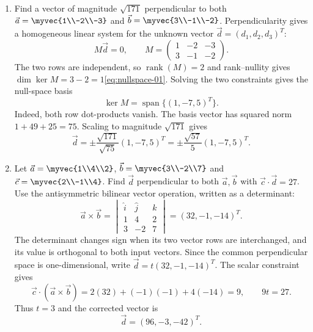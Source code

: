 
\renewcommand{\theenumi}{\thesubsection.\arabic{enumi}}
\renewcommand{\labelenumi}{\textbf{\theenumi}}
\begin{enumerate}[leftmargin=4mm,itemsep=9pt]
\paragraph*{Vectors and three-dimensional geometry}
\item Find a vector of magnitude $\sqrt{171}$ perpendicular to both $\vec a=\myvec{1\\-2\\-3}$ and $\vec b=\myvec{3\\-1\\-2}$.
\solution Perpendicularity gives a homogeneous linear system for the unknown vector $\vec d=(d_1,d_2,d_3)^T$:
\[
M\vec d=0,\qquad
M=\begin{pmatrix}1&-2&-3\\3&-1&-2\end{pmatrix}.
\]
The two rows are independent, so $\operatorname{rank}(M)=2$ and rank--nullity gives $\dim\ker M=3-2=1$\qquad\eqref{eq:nullspace-01}. Solving the two constraints gives the null-space basis
\[
\ker M=\operatorname{span}\{(1,-7,5)^T\}.
\]
Indeed, both row dot-products vanish. The basis vector has squared norm $1+49+25=75$. Scaling to magnitude $\sqrt{171}$ gives
\[
\vec d=\pm\frac{\sqrt{171}}{\sqrt{75}}(1,-7,5)^T
=\boxed{\pm\frac{\sqrt{57}}5(1,-7,5)^T}.
\]

\addtocounter{enumi}{3}
\item Let $\vec a=\myvec{1\\4\\2}$, $\vec b=\myvec{3\\-2\\7}$ and $\vec c=\myvec{2\\-1\\4}$. Find $\vec d$ perpendicular to both $\vec a,\vec b$ with $\vec c\cdot\vec d=27$.
\solution Use the antisymmetric bilinear vector operation, written as a determinant:
\[
\vec a\times\vec b=
\begin{vmatrix}
\hat i&\hat j&\hat k\\
1&4&2\\
3&-2&7
\end{vmatrix}
=(32,-1,-14)^T.
\]
The determinant changes sign when its two vector rows are interchanged, and its value is orthogonal to both input vectors. Since the common perpendicular space is one-dimensional, write $\vec d=t(32,-1,-14)^T$. The scalar constraint gives
\[
\vec c\cdot(\vec a\times\vec b)=2(32)+(-1)(-1)+4(-14)=9,
\qquad 9t=27.
\]
Thus $t=3$ and the corrected vector is
\[
\boxed{\vec d=(96,-3,-42)^T}.

\]
\end{enumerate}
